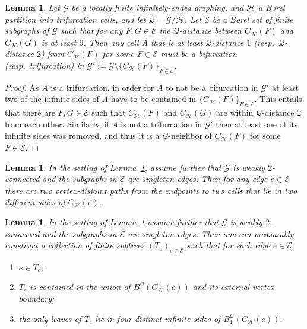 \documentclass[10pt,a4paper]{amsart}
\theoremstyle{plain}
\newtheorem{lem}[thm]{Lemma}
\theoremstyle{definition}
\providecommand{\cG}{\mathcal{G}}
\providecommand{\cQ}{\mathcal{Q}}
\providecommand{\cE}{\mathcal{E}}
\providecommand{\cH}{\mathcal{H}}
\begin{document}
\setcounter{section}{3}
\setcounter{thm}{1}
\begin{lem}\label{lem:bi_tri}
    Let $\cG$ be a locally finite infinitely-ended graphing, and $\cH$ a Borel partition into trifurcation cells, and let $\cQ=\cG/\cH$. Let $\cE$ be a Borel set of finite subgraphs of $\cG$ such that for any $F,G\in \cE$ the $\cQ$-distance between $C_\cH(F)$ and $C_\cH(G)$ is at least $9$.    
    Then any cell $A$ that is at least $\cQ$-distance $1$ (resp.~$\cQ$-distance $2$) from $C_\cH(F)$ for some $F\in\cE$ must be a bifurcation (resp.~trifurcation) in $\cG':=\cG\setminus \{C_{\cH}(F)\}_{F\in\cE}$.
\end{lem}
\begin{proof}
    As $A$ is a trifurcation, in order for $A$ to not be a bifurcation in $\cG'$ at least two of the infinite sides of $A$ have to be contained in $\{C_{\cH}(F)\}_{F\in \cE}$. This entails that there are $F,G\in \cE$ such that $C_\cH(F)$ and $C_\cH(G)$ are within $\cQ$-distance $2$ from each other.
    Similarly, if $A$ is not a trifurcation in $\cG'$ then at least one of its infinite sides was removed, and thus it is a $\cQ$-neighbor of $C_\cH(F)$ for some $F\in\cE$.
\end{proof}

\setcounter{thm}{3}
\begin{lem}%
\label{lem:disj_path}
    In the setting of Lemma~\ref{lem:bi_tri}, assume further that $\cG$ is weakly $2$-connected and the subgraphs in $\cE$ are singleton edges. 
    Then for any edge $e\in \cE$ there are two vertex-disjoint paths from the endpoints to two cells that lie in two different sides of $C_{\cH}(e)$.
\end{lem}

\setcounter{thm}{4}
\begin{lem}\label{lem:trees_on_edges}
    In the setting of Lemma~\ref{lem:bi_tri} assume further that $\cG$ is weakly $2$-connected and the subgraphs in $\cE$ are singleton edges. Then one can measurably construct a collection of finite subtrees $(T_e)_{e \in \cE}$ such that for each edge $e\in \cE$ 
     \begin{enumerate}
         \item $e\in T_e$;
         \item $T_e$ is contained in the union of $B_1^{\cQ}(C_{\cH}(e))$ and its external vertex boundary;
         \item the only leaves of $T_e$ lie in four distinct infinite sides of $B_1^{\cQ}(C_{\cH}(e))$.
     \end{enumerate}
    \end{lem}
\end{document}
